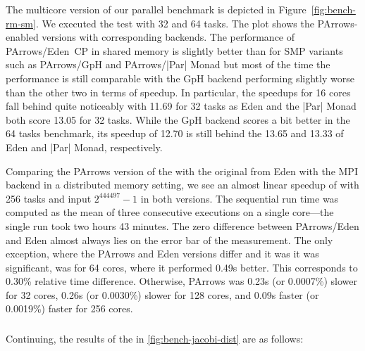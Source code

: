 The multicore version of our parallel \rmtest benchmark is depicted in
Figure~\ref{fig:bench-rm-sm}. We executed the test with 32 and 64
tasks. The plot shows the PArrows-enabled versions with corresponding backends.
The performance of PArrows/Eden~CP in shared memory is slightly better than
for SMP variants such as PArrows/GpH and PArrows/|Par|
Monad but most of the time the performance is still comparable with the GpH backend performing slightly worse than the other two in terms of speedup. In particular, the speedups for 16 cores fall behind quite noticeably with 11.69 for 32 tasks as Eden and the |Par| Monad both score 13.05 for 32 tasks. While the GpH backend scores a bit better in the 64 tasks benchmark, its speedup of 12.70 is still behind the 13.65 and 13.33 of Eden and |Par| Monad, respectively.

Comparing the PArrows version of the \rmtest with the original from Eden with the MPI backend in a distributed memory setting, we see an almost linear speedup of
\rmtest with 256 tasks and input $2^{444497}-1$ in both versions. The sequential run time
was computed as the mean of three consecutive executions on a single
core---the single run took two hours 43 minutes. The zero difference  between
PArrows/Eden and Eden almost always lies on the error bar of
the measurement. The only exception, where the PArrows and Eden versions differ and it was it was significant, was for 64 cores, where it performed 0.49s better. This corresponds to
0.30\% relative time difference. Otherwise, PArrows was 0.23s (or 0.0007\%) slower for 32 cores, 0.26s (or 0.0030\%) slower for 128 cores, and 0.09s faster (or 0.0019\%) faster for 256 cores.


\subsubsection{\jacobitest}

Continuing, the results of the \jacobitest in \ref{fig:bench-jacobi-dist} are as follows:

